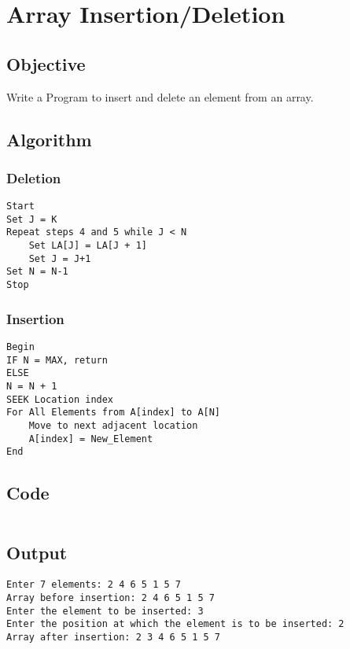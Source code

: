 \section{Array Insertion/Deletion}
\label{sec:Array Insertion/Deletion}

\subsection{Objective}
Write a Program to insert and delete an element from an array.

\subsection{Algorithm}

\subsubsection{Deletion}
\begin{lstlisting}[style=mystyle]
Start
Set J = K
Repeat steps 4 and 5 while J < N
    Set LA[J] = LA[J + 1]
    Set J = J+1
Set N = N-1
Stop
\end{lstlisting}

\subsubsection{Insertion}
\begin{lstlisting}[style=mystyle]
Begin
IF N = MAX, return
ELSE
N = N + 1
SEEK Location index
For All Elements from A[index] to A[N]
    Move to next adjacent location
    A[index] = New_Element
End
\end{lstlisting}

\subsection{Code}
\inputminted[]{c}{../../Code/array.c}

\subsection{Output}
\begin{lstlisting}[style=output]
Enter 7 elements: 2 4 6 5 1 5 7
Array before insertion: 2 4 6 5 1 5 7 
Enter the element to be inserted: 3
Enter the position at which the element is to be inserted: 2
Array after insertion: 2 3 4 6 5 1 5 7
\end{lstlisting}

\pagebreak
